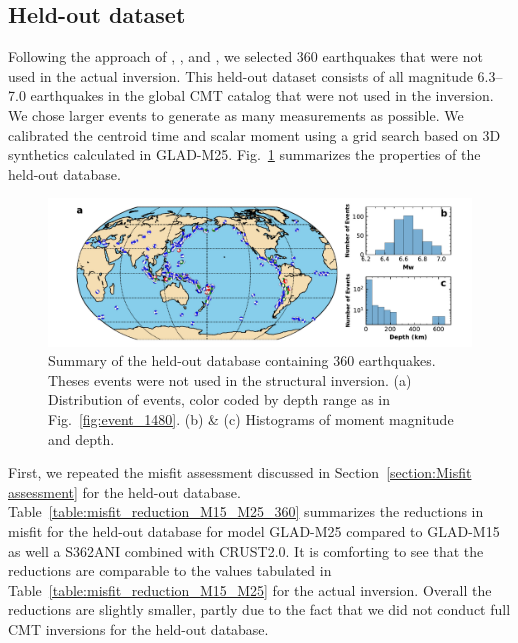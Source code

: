 \documentclass[extra,mreferee]{gji}
\begin{document}
\subsection{Held-out dataset}

Following the approach of \cite{tape2009adjoint}, \cite{chen2015multiparameter}, and \cite{bozdaug2016global},
we selected 360 earthquakes that were not used in the actual inversion.
This held-out dataset consists of all magnitude 6.3--7.0 earthquakes in the global CMT catalog that were not used in the inversion.
We chose larger events to generate as many measurements as possible.
We calibrated the centroid time and scalar moment using a grid search based on 3D synthetics calculated in GLAD-M25.
Fig.~\ref{fig:events_360} summarizes the properties of the held-out database.

\begin{figure}
  \centering
  \includegraphics[width=\textwidth]{figures/events_360.pdf}
  \caption{Summary of the held-out database containing 360 earthquakes. Theses events were not used in the structural inversion. (a) Distribution of events, color coded by depth range as in Fig.~\ref{fig:event_1480}. (b) \& (c) Histograms of moment magnitude and depth.}
  \label{fig:events_360}
\end{figure}

First, we repeated the misfit assessment discussed in Section~\ref{section:Misfit assessment} for the held-out database.
Table~\ref{table:misfit_reduction_M15_M25_360} summarizes the reductions in misfit for the held-out database for model GLAD-M25 compared to GLAD-M15 as well a S362ANI combined with CRUST2.0.
It is comforting to see that the reductions are comparable to the
values tabulated in Table~\ref{table:misfit_reduction_M15_M25} for the actual inversion.
Overall the reductions are slightly smaller, partly due to the fact that we did not conduct full CMT inversions for the held-out database.
\end{document}
